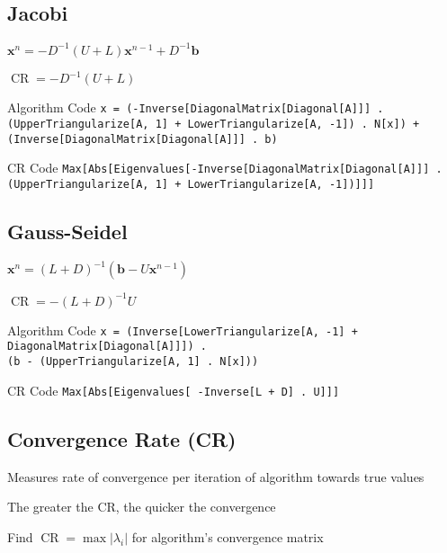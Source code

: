 \documentclass[10pt,letterpaper]{article}
\newenvironment{tight_item}
{\begin{itemize}
\setlength{\parskip}{0pt}
\setlength{\parsep}{0pt}
\setlength{\itemsep}{0pt}
\setlength{\parsep}{0pt}
\setlength{\topsep}{0pt}
\setlength{\partopsep}{0pt}
\setlength{\leftmargin}{0em}
\setlength{\labelwidth}{0em}
\setlength{\labelsep}{1em} }
{\end{itemize}}
\newenvironment{tight_enum}
{\begin{enumerate}
\setlength{\parskip}{0pt}
\setlength{\parsep}{0pt}
\setlength{\itemsep}{0pt}
\setlength{\parsep}{0pt}
\setlength{\topsep}{0pt}
\setlength{\partopsep}{0pt}
\setlength{\leftmargin}{0em}
\setlength{\labelwidth}{0em}
\setlength{\labelsep}{1em} }
{\end{enumerate}}
\newenvironment{tight_desc}
{\begin{description}
\setlength{\parskip}{0pt}
\setlength{\parsep}{0pt}
\setlength{\itemsep}{0pt}
\setlength{\parsep}{0pt}
\setlength{\topsep}{0pt}
\setlength{\partopsep}{0pt}
\setlength{\leftmargin}{0em}
\setlength{\labelwidth}{0em}
\setlength{\labelsep}{1em} }
{\end{description}}
\begin{document}
\begin{multicols*}{2}
\subsection{Jacobi}
\begin{tight_item}
\item $\mathbf{x}^{n} = -D^{-1}(U + L)\mathbf{x}^{n-1}+ D^{-1}\mathbf{b}$
\item $\operatorname{CR} = -D^{-1}(U+L)$
\end{tight_item}
\begin{tight_desc}
\item[Algorithm Code] \texttt{x = (-Inverse[DiagonalMatrix[Diagonal[A]]] .\\(UpperTriangularize[A, 1] + LowerTriangularize[A, -1]) . N[x]) +\\(Inverse[DiagonalMatrix[Diagonal[A]]] . b)}
\item[CR Code] \texttt{Max[Abs[Eigenvalues[-Inverse[DiagonalMatrix[Diagonal[A]]] .\\(UpperTriangularize[A, 1] + LowerTriangularize[A, -1])]]]}
\end{tight_desc}

\subsection{Gauss-Seidel}
\begin{tight_item}
\item $\mathbf{x}^{n} = (L+D)^{-1}(\mathbf{b}-U\mathbf{x}^{n-1})$
\item $\operatorname{CR} = -(L+D)^{-1}U$
\end{tight_item}
\begin{tight_desc}
\item[Algorithm Code] \texttt{x = (Inverse[LowerTriangularize[A, -1] +\\DiagonalMatrix[Diagonal[A]]]) .\\(b - (UpperTriangularize[A, 1] . N[x]))}
\item[CR Code] \texttt{Max[Abs[Eigenvalues[ -Inverse[L + D] . U]]]}
\end{tight_desc}

\subsection{Convergence Rate (CR)}
\begin{tight_item}
\item Measures rate of convergence per iteration of algorithm towards true values
\item The greater the CR, the quicker the convergence
\end{tight_item}
\begin{tight_enum}
\item Find $\operatorname{CR} = \max{|\lambda_{i}|}$ for algorithm's convergence matrix
\end{tight_enum}


\end{multicols*}
\end{document}
